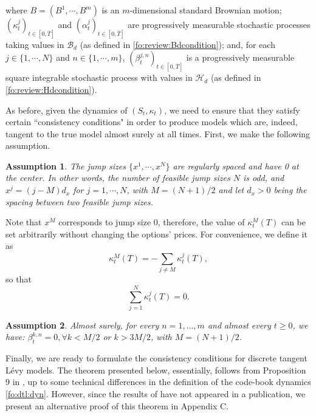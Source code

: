 \documentclass{article}
\numberwithin{equation}{section}
\newtheorem{ass}{Assumption}
\begin{document}
where $B=(B^1,\cdots,B^m)$ is an $m$-dimensional standard Brownian motion; $(\kappa_t^j)_{t\in[0,\bar{T}]}$ and $(\alpha_t^j)_{t\in[0,\bar{T}]}$ are progressively measurable stochastic processes taking values in $\mathcal{B}_d$ (as defined in \eqref{fo:review:Bdcondition}); and, for each $j\in\{1,\cdots,N\}$ and $n\in\{1,\cdots,m\}$, $(\beta^{j,n}_t)_{t\in [0,\bar{T}]}$ is a progressively measurable square integrable stochastic process with values in $\mathcal{H}_d$ (as defined in \eqref{fo:review:Hdcondition}).


As before, given the dynamics of $(S_t,\kappa_t)$, we need to ensure that they satisfy certain ``consistency conditions" in order to produce models which are, indeed, tangent to the true model almost surely at all times. 
First, we make the following assumption.
\begin{ass}\label{ass:dtl.1}
The jump sizes $\{x^1,\cdots,x^N\}$ are regularly spaced and have 0 at the center. In other words, the number of feasible jump sizes $N$ is odd, and $x^j = (j - M)d_x$ for $j = 1,\cdots,N$, with $M = (N+1)/2$ and let $d_x>0$ being the spacing between two feasible jump sizes.
\end{ass}
Note that $x^M$ corresponds to jump size $0$, therefore, the value of $\kappa^M_t(T)$ can be set arbitrarily without changing the options' prices.
For convenience, we define it as
\begin{equation} \label{eq.dtl.new.1} 
\kappa^M_t(T) = - \sum_{j\neq M} \kappa^j_t(T),
\end{equation} 
so that
\begin{equation} \label{fo:dtL:xassumption2}
\sum_{j=1}^N \kappa^j_t(T) = 0.
\end{equation}

\begin{ass}\label{ass:dtl.2}
Almost surely, for every $n=1,\ldots,m$ and almost every $t\geq0$, we have: $\beta_t^{k,n} = 0, \forall k < M/2$ or $k > 3M/2$, with $M = (N+1)/2$.
\end{ass}

Finally, we are ready to formulate the consistency conditions for discrete tangent L\'{e}vy models. The theorem presented below, essentially, follows from Proposition 9 in \cite{emmanuel2014discrete}, up to some technical differences in the definition of the code-book dynamics \eqref{fo:dtl:dyn}. However, since the results of \cite{emmanuel2014discrete} have not appeared in a publication, we present an alternative proof of this theorem in Appendix C.
\end{document}

